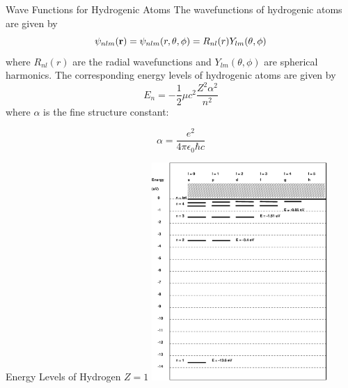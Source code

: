 \documentclass[xcolor=dvipsnames,t]{beamer}
\begin{document}
    \begin{frame}{Wave Functions for Hydrogenic Atoms} 
    The wavefunctions of hydrogenic atoms are given by
    \begin{equation}
        \psi_{nlm}({\bf r}) = \psi_{nlm}(r,\theta,\phi)
                           = R_{nl}(r) Y_{lm}(\theta, \phi)
    \end{equation}
    where $R_{nl}(r)$ are the radial wavefunctions and $Y_{lm}(\theta, \phi)$ are
    spherical harmonics. The corresponding energy levels of hydrogenic atoms are
    given by
    \begin{equation}
        E_n = - \frac{1}{2} \mu c^2 \frac{Z^2 \alpha^2}{n^2}
    \end{equation}
    where $\alpha$ is the fine structure constant: 

    $$ \alpha = \frac{e^2}{4 \pi \epsilon_0 \hbar c} $$

    \end{frame} 

    

    \begin{frame}{Energy Levels of Hydrogen $Z=1$} 
        \centering
        \includegraphics[width=0.5\textwidth]{levels.eps}
    \end{frame} 
\end{document}
